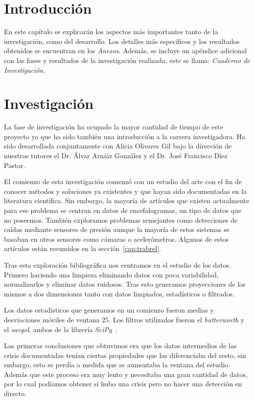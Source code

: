 \section{Introducción}\label{cap:asp-rel}

En este capítulo se explicarán los aspectos más importantes tanto de la investigación, como del desarrollo. Los detalles más específicos y los resultados obtenidos se encuentran en los \textit{Anexos}. Además, se incluye un apéndice adicional con las fases y resultados de la investigación realizada, este se llama: \textit{Cuaderno de Investigación}.

\section{Investigación}

La fase de investigación ha ocupado la mayor cantidad de tiempo de este proyecto ya que ha sido también una introducción a la carrera investigadora. Ha sido desarrollada conjuntamente con Alicia Olivares Gil bajo la dirección de nuestros tutores el Dr. Álvar Arnáiz González y el Dr. José Francisco Díez Pastor.

El comienzo de esta investigación comenzó con un estudio del arte con el fin de conocer métodos y soluciones ya existentes y que hayan sido documentadas en la literatura científica. Sin embargo, la mayoría de artículos que existen actualmente para ese problema se centran en datos de encefalogramas, un tipo de datos que no poseemos. También exploramos problemas semejantes como detecciones de caídas mediante sensores de presión aunque la mayoría de estos sistemas se basaban en otros sensores como cámaras o acelerómetros. Algunos de estos artículos están resumidos en la sección~\ref{cap:trabrel}.

Tras esta exploración bibliográfica nos centramos en el estudio de los datos. Primero haciendo una limpieza eliminando datos con poca variabilidad, normalizarlos y eliminar datos ruidosos. Tras esto generamos proyecciones de los mismos a dos dimensiones tanto con datos limpiados, estadísticos o filtrados.

Los datos estadísticos que generamos en un comienzo fueron medias y desviaciones móviles de ventana $25$. Los filtros utilizados fueron el \textit{butterworth} y el \textit{savgol}, ambos de la librería \textit{SciPy}~\cite{tool:scipy}.

Las primeras conclusiones que obtuvimos era que los datos intermedios de las crisis documentadas tenían ciertas propiedades que las diferenciaba del resto, sin embargo, esto se perdía a medida que se aumentaba la ventana del estudio. Además que este proceso era muy lento y necesitaba una gran cantidad de datos, por lo cual podíamos obtener si hubo una crisis pero no hacer una detección en directo.

